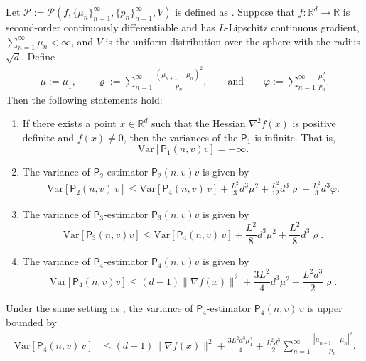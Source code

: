 \documentclass[10pt,a4paper]{amsart}
\newcommand{\RR}{\mathbb{R}}
\newcommand{\Var}{\mathrm{Var}}
\newcommand{\sfP}{\mathsf{P}}
\begin{document}
\begin{theorem}\label{thm:variance-appendix} 
Let $\mathscr{P}:=\mathscr{P}(f, \{ \mu_n\}_{n=1}^\infty, \{ p_n\}_{n=1}^\infty,V)$ is defined as . Suppose that $f:\RR^d \to \RR$ is second-order continuously differentiable and has $L$-Lipschitz continuous gradient, $\sum_{n=1}^\infty \mu_n < \infty$, and $V$ is the uniform distribution over the  sphere with the radius $\sqrt{d}$. Define 
\begin{align*}
    \mu:=\mu_1, \qquad\varrho:= \sum_{n=1}^\infty \frac{(\mu_{n+1} - \mu_{n})^2}{p_n}, \qquad \text{and} \qquad \varphi:=\sum_{n=1}^\infty  \frac{\mu_{n}^2}{p_n}.
\end{align*}
Then the following statements hold:
    \begin{enumerate}[label=(\alph*)]
        \item If there exists a point $x\in \RR^d$ such that the Hessian $\nabla^2 f(x)$ is positive definite and $f(x)\neq 0$, then the variances of the $\sfP_1$ is infinite. That is,
        $$\Var[\sfP_1(n,v) v] = + \infty.$$
        \item  The variance of $\sfP_2$-estimator $\sfP_2(n,v) v$ is given by
\begin{align*}
    \Var[\sfP_2(n,v) \, v ]  
    \leq  \Var[\sfP_4(n,v)\, v] + \frac{L^2 }{3} d^3\mu^2 + \frac{L^2}{12}  d^3  \varrho  + \frac{L^2}{3} d^3   \varphi.
\end{align*}
        \item  The variance of $\sfP_3$-estimator $\sfP_3(n,v) v$ is given by
        $$\Var[\sfP_3(n,v) v] \leq \Var[\sfP_4(n,v)\, v] + \frac{L^2 }{8} d^3\mu^2 + \frac{L^2}{8}  d^3 \varrho. $$ 
        \item The variance of $\sfP_4$-estimator $\sfP_4(n,v) v$ is given by
        $$\Var[\sfP_4(n,v) v] \leq  (d-1) \| \nabla f(x) \|^2 +  \frac{3L^2}{4} d^3 \mu^2  +  \frac{L^2 d^3}{2}  \varrho.$$
    \end{enumerate}
\end{theorem}

\begin{lemma}\label{lemma:variance-p4}
    Under the same setting as , the variance of $\sfP_4$-estimator $\mathsf P_4(n,v)\,v$ is upper bounded by
\begin{align*}
      \Var[\mathsf P_4(n,v)\,v  ] & \leq (d-1) \| \nabla f(x) \|^2 + \frac{3L^2 d^3 \mu_1^2}{4}  +  \frac{L^2 d^3}{2}\sum_{n=1}^\infty \frac{| \mu_{n+1} - \mu_{n}|^2}{p_n} .
\end{align*} 
\end{lemma}
\end{document}
